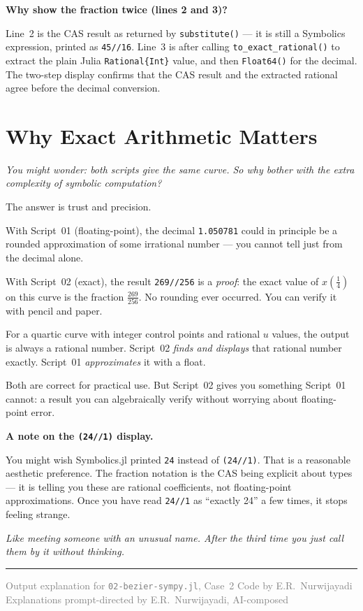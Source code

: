 \documentclass[12pt, a4paper]{article}
\newcommand{\cd}[1]{\texttt{#1}}
\begin{document}
\begin{notebox}
\textbf{Why show the fraction twice (lines 2 and 3)?}

Line~2 is the CAS result as returned by \cd{substitute()} ---
it is still a Symbolics expression, printed as \cd{45//16}.
Line~3 is after calling \cd{to\_exact\_rational()} to extract
the plain Julia \cd{Rational\{Int\}} value, and then
\cd{Float64()} for the decimal.
The two-step display confirms that the CAS result and the
extracted rational agree before the decimal conversion.
\end{notebox}


\section{Why Exact Arithmetic Matters}

\textit{You might wonder: both scripts give the same curve.
So why bother with the extra complexity of symbolic computation?}

The answer is trust and precision.

With Script~01 (floating-point), the decimal \cd{1.050781} could
in principle be a rounded approximation of some irrational number
--- you cannot tell just from the decimal alone.

With Script~02 (exact), the result \cd{269//256} is a \emph{proof}:
the exact value of $x\!\left(\tfrac{1}{4}\right)$ on this curve
is the fraction $\frac{269}{256}$.
No rounding ever occurred.
You can verify it with pencil and paper.

For a quartic curve with integer control points and rational
$u$ values, the output is always a rational number.
Script~02 \emph{finds and displays} that rational number exactly.
Script~01 \emph{approximates} it with a float.

Both are correct for practical use.
But Script~02 gives you something Script~01 cannot:
a result you can algebraically verify without worrying
about floating-point error.

\begin{notebox}
\textbf{A note on the \cd{(24//1)} display.}

You might wish Symbolics.jl printed \cd{24} instead of \cd{(24//1)}.
That is a reasonable aesthetic preference.
The fraction notation is the CAS being explicit about types ---
it is telling you these are rational coefficients,
not floating-point approximations.
Once you have read \cd{24//1} as ``exactly 24'' a few times,
it stops feeling strange.

\textit{Like meeting someone with an unusual name.
After the third time you just call them by it without thinking.}
\end{notebox}

\vspace{2em}\hrule\vspace{0.5em}
{\small\textcolor{gray}{%
Output explanation for \texttt{02-bezier-sympy.jl}, Case~2
\textbar{} Code by E.R.\ Nurwijayadi
\textbar{} Explanations prompt-directed by E.R.\ Nurwijayadi, AI-composed}}
\end{document}
